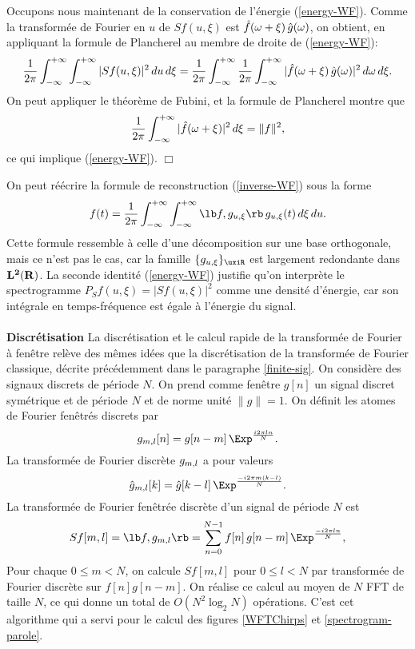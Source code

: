 Occupons nous maintenant de la conservation de l'\'{e}nergie 
(\ref{energy-WF}). Comme la transform\'{e}e de Fourier en $u$ de 
$Sf(u,\xi)$ est $\hat	f({\omega} +	\xi) \,\hat	g({\omega} )$,
on obtient, en appliquant la formule de Plancherel au membre de 
droite de (\ref{energy-WF}):
\[
\frac 1 {2 \pi} \int_{-\infty}^{+\infty}  \int_{-\infty}^{+\infty} 
|Sf(u,\xi)|^2 \,du\, d\xi = 
\frac 1 {2 \pi} \int_{-\infty}^{+\infty}  
\frac 1 {2 \pi} \int_{-\infty}^{+\infty}  
|\hat f({\omega} + \xi) \,\hat g({\omega} ) |^2 \,d{\omega}\, d\xi .
\]
On peut appliquer le th\'{e}or\`{e}me de Fubini, et la formule de 
Plancherel montre que
\[
\frac 1 {2 \pi} \int_{-\infty}^{+\infty}  
|\hat f({\omega} + \xi) |^2\,  d\xi = \|f \|^2,
\]
ce qui implique (\ref{energy-WF}). $\Box$


On peut r\'{e}\'{e}crire la formule de reconstruction 
(\ref{inverse-WF}) sous la forme
\begin{equation}
f(t) = \frac 1 {2 \pi} \int_{-\infty}^{+\infty}  \int_{-\infty}^{+\infty} 
\lb f,g_\uxi\rb \, g_\uxi (t)\,  d\xi\, du .
\end{equation}
Cette formule ressemble \`{a} celle d'une d\'{e}composition sur une base 
orthogonale, mais ce n'est pas le cas, car la famille $\{g_\uxi \}_\uxiR$ 
est largement redondante dans ${\bf L ^ 2 ({\bf{R}})}$. La seconde identit\'{e} 
(\ref{energy-WF})  justifie qu'on interpr\`{e}te le spectrogramme 
$P_S f(u,\xi)=|Sf(u,\xi)|^2$ comme une densit\'{e} d'\'{e}nergie, car 
son int\'{e}grale en temps-fr\'{e}quence est \'{e}gale \`{a} 
l'\'{e}nergie du signal.
\\
\\
{\bf Discr\'{e}tisation}
La discr\'{e}tisation et le calcul rapide de la transform\'{e}e de 
Fourier \`a fen\^{e}tre rel\`{e}ve des m\^{e}mes id\'{e}es que la 
discr\'{e}tisation de la transform\'{e}e de Fourier classique, 
d\'{e}crite pr\'{e}c\'edemment dans le paragraphe \ref{finite-sig}. On
consid\`{e}re des signaux discrets de p\'{e}riode $N$. On prend comme 
fen\^{e}tre $g[n]$ un signal discret sym\'{e}trique et de p\'{e}riode 
$N$ et de norme unit\'{e} $\|g \| =	1.$ On d\'{e}finit les atomes de 
Fourier fen\^{e}tr\'{e}s discrets
par
\[
g_\ml [n] = g[n-m] \, \Exp^{\frac {i 2 \pi  ln} N}. 
\]
La transform\'{e}e de Fourier discr\`{e}te $g_{m,l}$ a pour valeurs
\[
\hat g_\ml [k] = \hat g[k-l] \, \Exp^{\frac {-i 2 \pi  m (k-l)} N}. 
\]
La transform\'{e}e de Fourier fen\^{e}tr\'{e}e discr\`{e}te d'un 
signal de p\'{e}riode $N$ est
\begin{equation}
\label{DisWdinFTa}
Sf[m,l] = \lb f,g_\ml\rb  = \sum_{n=0}^{N-1} 
f[n]\, g[n-m]\, \Exp^{\frac {-i2\pi ln} N} ,
\end{equation}
Pour chaque $0 \leq	m <	N$, on calcule $Sf[m,l]$ pour $0 \leq l < N$ 
par transform\'{e}e de Fourier discr\`{e}te sur $f[n] g[n-m]$. On 
r\'{e}alise ce calcul au moyen de $N$ FFT de taille $N$, ce qui donne 
un total de $O(N^2 \log_2 N)$ op\'{e}rations. C'est cet algorithme qui 
a servi pour le calcul des figures \ref{WFTChirps} et 
\ref{spectrogram-parole}.


